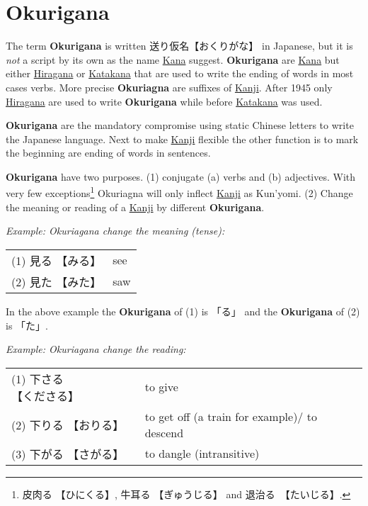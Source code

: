 \section{Okurigana} \label{sec:Okurigana}

The term \textbf{Okurigana} is written {送り仮名}{【おくりがな】} in Japanese,
but it is \textit{not} a script by its own as the name
\hyperref[sec:Kana]{Kana} suggest.  \textbf{Okurigana} are
\hyperref[sec:Kana]{Kana} but either \hyperref[sec:Hiragana]{Hiragana} or
\hyperref[sec:Katakana]{Katakana} that are used to write the ending of words in
most cases verbs. More precise \textbf{Okuriagna} are suffixes of
\hyperref[sec:Kanji]{Kanji}. After 1945 only
\hyperref[sec:Hiragagana]{Hiragana} are used to write \textbf{Okurigana} while
before \hyperref[sec:Katakana]{Katakana} was used. 

\textbf{Okurigana} are the mandatory compromise using static Chinese letters to
write the Japanese language. Next to make \hyperref[sec:Kanji]{Kanji} flexible
the other function is to mark the beginning are ending of words in sentences. 

\textbf{Okurigana} have two purposes. (1) conjugate (a) verbs and (b)
adjectives. With very few exceptions\footnote{ {皮肉る} {【ひにくる】},
{牛耳る}  {【ぎゅうじる】} and {退治る}　{【たいじる】}.}  Okuriagna will only
inflect \hyperref[sec:Kanji]{Kanji} as Kun'yomi.  (2) Change the meaning or
reading of a \hyperref[sec:Kanji]{Kanji} by different \textbf{Okurigana}.

\textit{Example: Okuriagana change the meaning (tense):}

\begin{center}\begin{tabular}{ll}
(1) {見る} {【みる】} & see \\
(2) {見た} {【みた】} & saw \\
\end{tabular}\end{center}

In the above example the \textbf{Okurigana} of (1) is {「る」} and the
\textbf{Okurigana} of (2) is {「た」}.

\textit{Example: Okuriagana change the reading:}

\begin{center}\begin{tabular}{ll}
(1) {下さる} {【くださる】} & to give \\
(2) {下りる} {【おりる】} &  to get off (a train for example)/ to descend \\
(3) {下がる} {【さがる】} &  to dangle (intransitive)\\
\end{tabular}\end{center}

